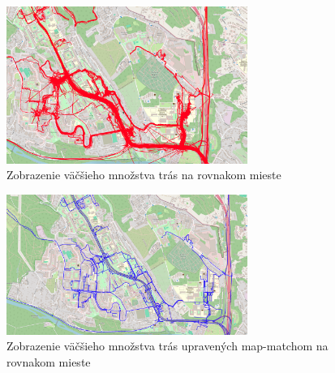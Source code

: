 \begin{figure}[H]
  \centering
  \includegraphics[width=0.7\textwidth]{img/map-match rozdiel/pred map-match.png}
  \caption{Zobrazenie väčšieho množstva trás na rovnakom mieste}
  \label{fig:spagety}
\end{figure}
\begin{figure}[H]
  \centering
  \includegraphics[width=0.7\textwidth]{img/map-match rozdiel/po map-match.png}
  \caption{Zobrazenie väčšieho množstva trás upravených map-matchom na rovnakom mieste}
  \label{fig:niespagety}
\end{figure}

\pagebreak

